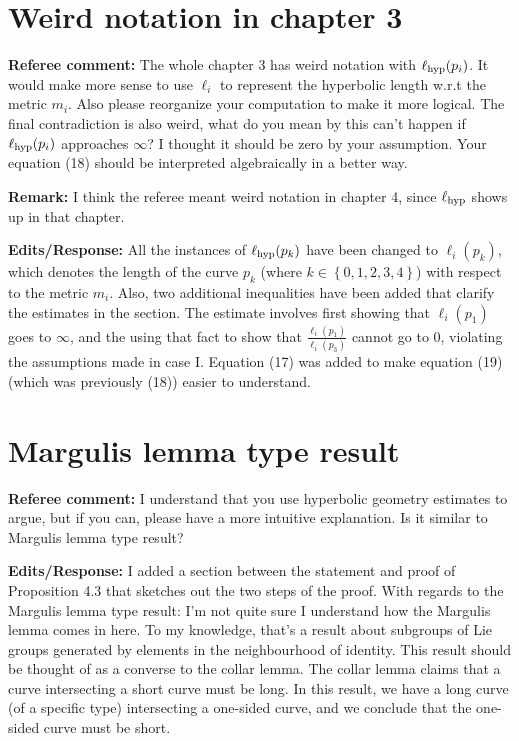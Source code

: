 \documentclass[12pt, reqno]{amsart}
\begin{document}
\section{Weird notation in chapter 3}
\label{sec:weird-notat-chapt}

\textbf{Referee comment:} The whole chapter 3 has weird notation with $\ell_{\mathrm{hyp}}(p_i)$. It would make more sense to use $\ell_i$ to represent the hyperbolic length w.r.t the metric $m_i$.
Also please reorganize your computation to make it more logical. The final contradiction is also weird, what do you mean by this can't happen if $\ell_{\mathrm{hyp}}(p_i)$ approaches $\infty$? I thought it should be zero by your assumption. Your equation (18) should be interpreted algebraically in a better way.

\textbf{Remark:} I think the referee meant weird notation in chapter 4, since $\ell_{\mathrm{hyp}}$ shows up in that chapter.

\textbf{Edits/Response:} All the instances of $\ell_{\mathrm{hyp}}(p_k)$ have been changed to $\ell_i(p_k)$, which denotes the length of the curve $p_k$ (where $k \in \left\{ 0, 1, 2, 3, 4 \right\}$) with respect to the metric $m_i$.
Also, two additional inequalities have been added that clarify the estimates in the section. The estimate involves first showing that $\ell_i(p_1)$ goes to $\infty$, and the using that fact to show that $\frac{\ell_i(p_1)}{\ell_i(p_3)}$ cannot go to $0$, violating the assumptions made in case I.
Equation (17) was added to make equation (19) (which was previously (18)) easier to understand.

\section{Margulis lemma type result}
\label{sec:margulis-lemma-type}

\textbf{Referee comment:} I understand that you use hyperbolic geometry estimates to argue, but if you can, please have a more intuitive explanation. Is it similar to Margulis lemma type result?

\textbf{Edits/Response:} I added a section between the statement and proof of Proposition 4.3 that sketches out the two steps of the proof.
With regards to the Margulis lemma type result: I'm not quite sure I understand how the Margulis lemma comes in here. To my knowledge, that's a result about subgroups of Lie groups generated by elements in the neighbourhood of identity.
This result should be thought of as a converse to the collar lemma.
The collar lemma claims that a curve intersecting a short curve must be long.
In this result, we have a long curve (of a specific type) intersecting a one-sided curve, and we conclude that the one-sided curve must be short.
\end{document}
